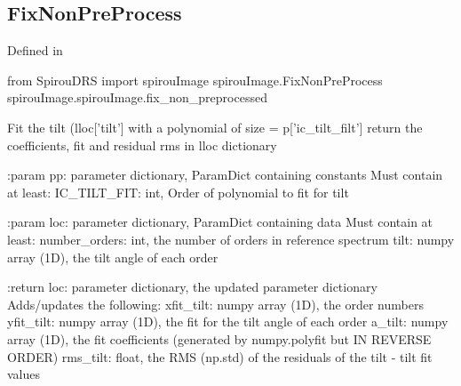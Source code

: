 \noindent\begin{minipage}{\textwidth}
\subsection{FixNonPreProcess}

Defined in \spirouImage{}

\begin{pythonbox}
from SpirouDRS import spirouImage
spirouImage.FixNonPreProcess
spirouImage.spirouImage.fix_non_preprocessed
\end{pythonbox}

\begin{pythondocstring}
Fit the tilt (lloc['tilt'] with a polynomial of size = p['ic_tilt_filt']
return the coefficients, fit and residual rms in lloc dictionary

:param pp: parameter dictionary, ParamDict containing constants
    Must contain at least:
        IC_TILT_FIT: int, Order of polynomial to fit for tilt

:param loc: parameter dictionary, ParamDict containing data
        Must contain at least:
            number_orders: int, the number of orders in reference spectrum
            tilt: numpy array (1D), the tilt angle of each order

:return loc: parameter dictionary, the updated parameter dictionary
        Adds/updates the following:
            xfit_tilt: numpy array (1D), the order numbers
            yfit_tilt: numpy array (1D), the fit for the tilt angle of each
                       order
            a_tilt: numpy array (1D), the fit coefficients (generated by
                    numpy.polyfit but IN REVERSE ORDER)
            rms_tilt: float, the RMS (np.std) of the residuals of the
                      tilt - tilt fit values
\end{pythondocstring}
\end{minipage}


